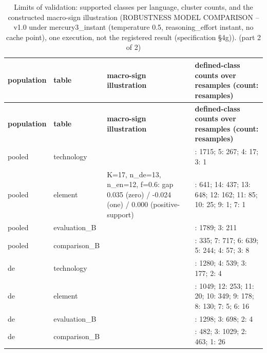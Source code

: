 \begingroup\footnotesize
\begin{longtable}{>{\raggedright\arraybackslash}p{67.2pt}>{\raggedright\arraybackslash}p{61.2pt}>{\raggedright\arraybackslash}p{153.5pt}>{\raggedright\arraybackslash}p{125.1pt}}
\caption{Limits of validation:\allowbreak{} supported classes per language, cluster counts, and the constructed macro-sign illustration (ROBUSTNESS MODEL COMPARISON -- v1.0 under mercury3\_\allowbreak{}instant (temperature 0.5, reasoning\_\allowbreak{}effort instant, no cache point), one execution, not the registered result (specification §4g)). (part 2 of 2)} \\
\toprule
\textbf{population} & \textbf{table} & \textbf{macro-sign illustration} & \textbf{defined-class counts over resamples (count:\allowbreak{} resamples)} \\
\midrule
\endfirsthead
\toprule
\textbf{population} & \textbf{table} & \textbf{macro-sign illustration} & \textbf{defined-class counts over resamples (count:\allowbreak{} resamples)} \\
\midrule
\endhead
\bottomrule
\endfoot
pooled & technology &  & 6:\allowbreak{} 1715; 5:\allowbreak{} 267; 4:\allowbreak{} 17; 3:\allowbreak{} 1 \\
pooled & element & K=\allowbreak{}17, n\_\allowbreak{}de=\allowbreak{}13, n\_\allowbreak{}en=\allowbreak{}12, f=\allowbreak{}0.6:\allowbreak{} gap 0.035 (zero) / -0.024 (one) / 0.000 (positive-support) & 15:\allowbreak{} 641; 14:\allowbreak{} 437; 13:\allowbreak{} 648; 12:\allowbreak{} 162; 11:\allowbreak{} 85; 10:\allowbreak{} 25; 9:\allowbreak{} 1; 7:\allowbreak{} 1 \\
pooled & evaluation\_\allowbreak{}B &  & 4:\allowbreak{} 1789; 3:\allowbreak{} 211 \\
pooled & comparison\_\allowbreak{}B &  & 8:\allowbreak{} 335; 7:\allowbreak{} 717; 6:\allowbreak{} 639; 5:\allowbreak{} 244; 4:\allowbreak{} 57; 3:\allowbreak{} 8 \\
de & technology &  & 5:\allowbreak{} 1280; 4:\allowbreak{} 539; 3:\allowbreak{} 177; 2:\allowbreak{} 4 \\
de & element &  & 13:\allowbreak{} 1049; 12:\allowbreak{} 253; 11:\allowbreak{} 20; 10:\allowbreak{} 349; 9:\allowbreak{} 178; 8:\allowbreak{} 130; 7:\allowbreak{} 5; 6:\allowbreak{} 16 \\
de & evaluation\_\allowbreak{}B &  & 4:\allowbreak{} 1298; 3:\allowbreak{} 698; 2:\allowbreak{} 4 \\
de & comparison\_\allowbreak{}B &  & 4:\allowbreak{} 482; 3:\allowbreak{} 1029; 2:\allowbreak{} 463; 1:\allowbreak{} 26 \\

\end{longtable}
